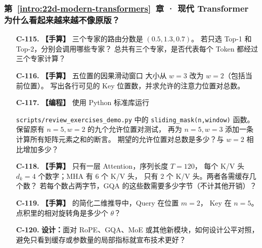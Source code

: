 \subsubsection*{第~\ref*{intro:22d-modern-transformers}~章 · 现代 Transformer 为什么看起来越来越不像原版？}
\begin{enumerate}[label={},leftmargin=4.8em,itemsep=4pt]
\item[\textbf{C-115.}] \leavevmode{}\label{exercise:C-115}\label{exercise:moe-routing}\textbf{【手算】} 三个专家的路由分数是 $(0.5,1.3,0.7)$。
若只选 Top-1 和 Top-2，分别会调用哪些专家？
总共有三个专家，是否代表每个 Token 都经过三个专家计算？
\item[\textbf{C-116.}] \leavevmode{}\label{exercise:C-116}\label{exercise:sliding-window-pairs}\textbf{【手算】} 五位置的因果滑动窗口
大小从 $w=3$ 改为 $w=2$（包括当前位置）。
写出各行可见的 Key 位置数，并求允许的注意力位置对总数。
\item[\textbf{C-117.}] \leavevmode{}\label{exercise:C-117}\label{exercise:sliding-window-code}\textbf{【编程】} 使用 Python 标准库运行
\par\noindent
\nolinkurl{scripts/review_exercises_demo.py} 中的
\texttt{sliding\_mask(n,window)} 函数。
保留原有 $n=5,w=2$ 的九个允许位置对测试，
再为 $n=5,w=3$ 添加一条计算所有矩阵元素之和的断言。
期望的允许位置对总数是多少？与 $w=2$ 相比增加多少？
\item[\textbf{C-118.}] \leavevmode{}\label{exercise:C-118}\label{exercise:gqa-cache-ratio}\label{exercise:linked-22d-modern-transformers}  \textbf{【手算】} 只有一层 Attention，序列长度 $T=120$，
每个 K/V 头 $d_k=4$ 个数字；MHA 有 $6$ 个 K/V 头，
 只有 $2$ 个 K/V 头。两者各需缓存几个数？
若每个数占两字节，GQA 的这些数需要多少字节（不计其他开销）？
\item[\textbf{C-119.}] \leavevmode{}\label{exercise:C-119}\label{exercise:rope-relative-position}\textbf{【手算】}  的简化二维推导中，Query 在位置 $m=2$，
Key 在 $n=5$。点积里的相对旋转角是多少个 $\theta$？
\item[\textbf{C-120.}] \leavevmode{}\label{exercise:C-120}\label{exercise:architecture-fair-comparison}\textbf{设计：}面对 RoPE、GQA、MoE 或其他新模块，如何设计公平对照，避免只看到缓存或参数量的局部指标就宣布技术更好？
\end{enumerate}
